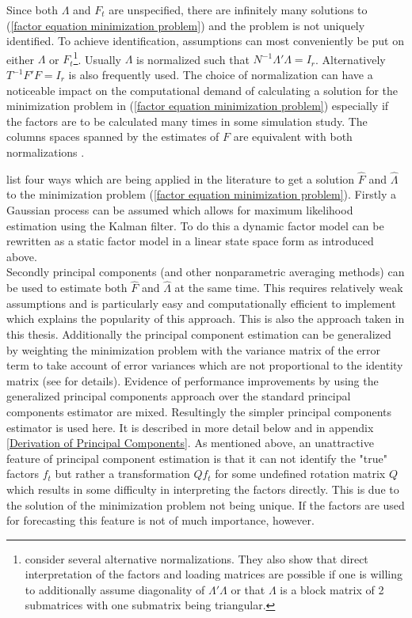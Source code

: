 \documentclass[12pt]{article}
\begin{document}
Since both $\Lambda$ and $F_t$ are unspecified, there are infinitely many solutions to (\ref{factor equation minimization problem}) and the problem is not uniquely identified. To achieve identification, assumptions can most conveniently be put on either $\Lambda$ or $F_t$\footnote{\citet{bai2013principal} consider several alternative normalizations. They also show that direct interpretation of the factors and loading matrices are possible if one is willing to additionally assume diagonality of $\Lambda'\Lambda$ or that $\Lambda$ is a block matrix of 2 submatrices with one submatrix being triangular.}. Usually $\Lambda$ is normalized such that $N^{-1} \Lambda'\Lambda = I_r$. Alternatively $T^{-1}F'F = I_r$ is also frequently used. The choice of normalization can have a noticeable impact on the computational demand of calculating a solution for the minimization problem in (\ref{factor equation minimization problem}) especially if the factors are to be calculated many times in some simulation study. The columns spaces spanned by the estimates of $F$ are equivalent with both normalizations \citep{stock2011dynamic}.

\citet{stock2011dynamic} list four ways which are being applied in the literature to get a solution $\hat F$ and $\hat \Lambda$ to the minimization problem (\ref{factor equation minimization problem}). Firstly a Gaussian process can be assumed which allows for maximum likelihood estimation using the Kalman filter. To do this a dynamic factor model can be rewritten as a static factor model in a linear state space form as introduced above. \\
Secondly principal components (and other nonparametric averaging methods) can be used to estimate both $\hat F$ and $\hat \Lambda$ at the same time. This requires relatively weak assumptions and is particularly easy and computationally efficient to implement which explains the popularity of this approach. This is also the approach taken in this thesis. Additionally the principal component estimation can be generalized by weighting the minimization problem with the variance matrix of the error term to take account of error variances which are not proportional to the identity matrix (see \citet{stock2011dynamic} for details). Evidence of performance improvements by using the generalized principal components approach over the standard principal components estimator are mixed. Resultingly the simpler principal components estimator is used here. It is described in more detail below and in appendix \ref{Derivation of Principal Components}. As mentioned above, an unattractive feature of principal component estimation is that it can not identify the "true" factors $f_t$ but rather a transformation $Q f_t$ for some undefined rotation matrix $Q$ which results in some difficulty in interpreting the factors directly. This is due to the solution of the minimization problem not being unique. If the factors are used for forecasting this feature is not of much importance, however.
\end{document}
